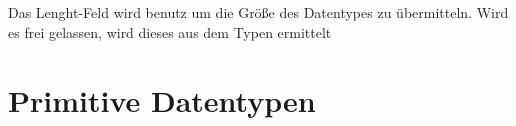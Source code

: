 \documentclass[a4paper,10pt]{article}
\begin{document}

Das Lenght-Feld wird benutz um die Größe des Datentypes zu übermitteln. Wird es frei gelassen, wird dieses aus dem Typen ermittelt
    
\section{Primitive Datentypen}
\end{document}
